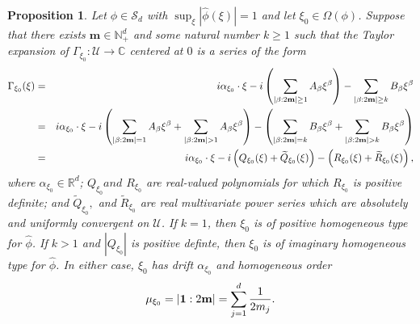 \documentclass[11pt]{article}
\newtheorem{proposition}[theorem]{Proposition}
\theoremstyle{remark}
\newcommand{\lp}{\left(}
\newcommand{\rp}{\right)}
\newcommand{\al}{\alpha}
\newcommand{\be}{\beta}
\begin{document}
\begin{proposition}\label{prop:ExpandGamma}
Let $\phi\in\mathcal{S}_d$ with $\sup_{\xi}|\widehat{\phi}(\xi)|=1$ and let $\xi_0\in\Omega(\phi)$. Suppose that there exists $\mathbf{m}\in \mathbb{N}^d_+$ and some natural number $k \geq 1$ such that the Taylor expansion of $\Gamma_{\xi_0} : \mathcal{U}\to\mathbb{C}$ centered at $0$ is a series of the form
\begin{eqnarray}\label{eq:SemiEllipticImaginaryExpansion}\nonumber
    \Gamma_{\xi_0}(\xi) 
    &=& i\al_{\xi_0} \cdot \xi - i \left( \sum_{\abs{\be : 2\mathbf{m}} \geq 1} A_\be \xi^\be\right) - \sum_{\abs{\be : 2\mathbf{m}} \geq k} B_\be \xi^\be \\ \nonumber
    &=& i\al_{\xi_0} \cdot \xi - i \lp \sum_{\abs{\be : 2\mathbf{m}} = 1} A_\be \xi^\be + \sum_{\abs{\be : 2\mathbf{m}} > 1} A_\be \xi^\be\rp 
    - \lp \sum_{\abs{\be : 2\mathbf{m}} = k} B_\be \xi^\be + \sum_{\abs{\be : 2\mathbf{m}} > k} B_\be \xi^\be \rp \\
    &=&  i\al_{\xi_0} \cdot \xi - i\lp Q_{\xi_0}(\xi) + \widetilde{Q}_{\xi_0}(\xi)\rp - \lp R_{\xi_0}(\xi) + \widetilde{R}_{\xi_0}(\xi) \rp,
\end{eqnarray}
where $\al_{\xi_0} \in \mathbb{R}^d$;   $Q_{\xi_0} and $ $R_{\xi_0}$ are real-valued polynomials for which $R_{\xi_0}$ is positive definite; and  $\widetilde{Q}_{\xi_0},$ and $\widetilde{R}_{\xi_0}$ are real multivariate power series which are absolutely and uniformly convergent on $\mathcal{U}$. If $k=1$, then $\xi_0$ is of positive homogeneous type for $\widehat{\phi}$. If $k>1$ and $|Q_{\xi_0}|$ is positive definte, then $\xi_0$ is of imaginary homogeneous type for $\hat{\phi}$. In either case, $\xi_0$ has drift $\alpha_{\xi_0}$ and homogeneous order
\begin{equation*}
    \mu_{\xi_0}=\abs{\mathbf{1}:2\mathbf{m}}=\sum_{j=1}^d\frac{1}{2m_j}.
\end{equation*}
\end{proposition}
\end{document}

